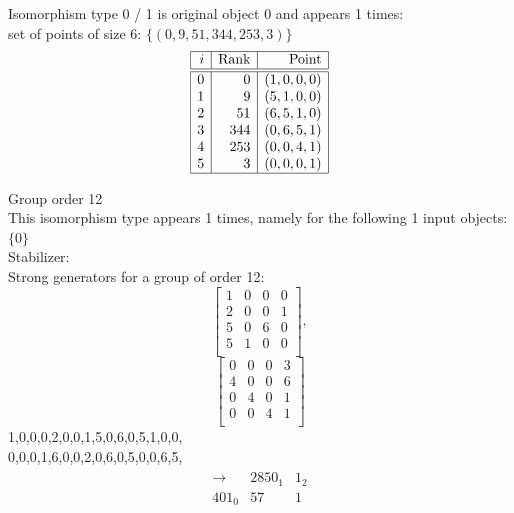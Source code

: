 Isomorphism type 0 / 1 is original object 0 and appears 1 times: \\
set of points of size 6: $\{( 0, 9, 51, 344, 253, 3 )\}$\\
$$
\begin{array}{|r|r|r|}
\hline
i & \mbox{Rank} & \mbox{Point} \\
\hline
\hline
0 & 0 & ( 1, 0, 0, 0 )\\
1 & 9 & ( 5, 1, 0, 0 )\\
2 & 51 & ( 6, 5, 1, 0 )\\
3 & 344 & ( 0, 6, 5, 1 )\\
4 & 253 & ( 0, 0, 4, 1 )\\
5 & 3 & ( 0, 0, 0, 1 )\\
\hline
\end{array}
$$

\bigskip

Group order 12\\
This isomorphism type appears 1 times, namely for the following 1 input objects: 
$
\{ 0 \}$\\
Stabilizer:\\
Strong generators for a group of order 12:
$$
\left[
\begin{array}{*{4}{r}}
1 & 0 & 0 & 0\\
2 & 0 & 0 & 1\\
5 & 0 & 6 & 0\\
5 & 1 & 0 & 0\\
\end{array}
\right]
, 
$$
$$
\left[
\begin{array}{*{4}{r}}
0 & 0 & 0 & 3\\
4 & 0 & 0 & 6\\
0 & 4 & 0 & 1\\
0 & 0 & 4 & 1\\
\end{array}
\right]
$$
1,0,0,0,2,0,0,1,5,0,6,0,5,1,0,0,\\
0,0,0,1,6,0,0,2,0,6,0,5,0,0,6,5,\\
\begin{align*}
\begin{array}{r|*{2}{r}}
\rightarrow  &   2850_{  1} &      1_{  2}\\
\hline
   401_{  0} &           57 &            1\\
\end{array}
\end{align*}
